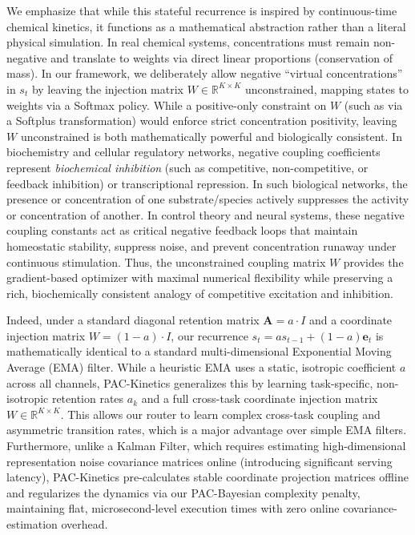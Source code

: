 We emphasize that while this stateful recurrence is inspired by continuous-time chemical kinetics, it functions as a mathematical abstraction rather than a literal physical simulation. In real chemical systems, concentrations must remain non-negative and translate to weights via direct linear proportions (conservation of mass). In our framework, we deliberately allow negative ``virtual concentrations'' in $s_t$ by leaving the injection matrix $W \in \mathbb{R}^{K \times K}$ unconstrained, mapping states to weights via a Softmax policy. While a positive-only constraint on $W$ (such as via a Softplus transformation) would enforce strict concentration positivity, leaving $W$ unconstrained is both mathematically powerful and biologically consistent. In biochemistry and cellular regulatory networks, negative coupling coefficients represent \emph{biochemical inhibition} (such as competitive, non-competitive, or feedback inhibition) or transcriptional repression. In such biological networks, the presence or concentration of one substrate/species actively suppresses the activity or concentration of another. In control theory and neural systems, these negative coupling constants act as critical negative feedback loops that maintain homeostatic stability, suppress noise, and prevent concentration runaway under continuous stimulation. Thus, the unconstrained coupling matrix $W$ provides the gradient-based optimizer with maximal numerical flexibility while preserving a rich, biochemically consistent analogy of competitive excitation and inhibition.

Indeed, under a standard diagonal retention matrix $\mathbf{A} = a \cdot I$ and a coordinate injection matrix $W = (1 - a) \cdot I$, our recurrence $s_t = a s_{t-1} + (1 - a) \mathbf{e}_t$ is mathematically identical to a standard multi-dimensional Exponential Moving Average (EMA) filter. While a heuristic EMA uses a static, isotropic coefficient $a$ across all channels, \textsf{PAC-Kinetics} generalizes this by learning task-specific, non-isotropic retention rates $a_k$ and a full cross-task coordinate injection matrix $W \in \mathbb{R}^{K \times K}$. This allows our router to learn complex cross-task coupling and asymmetric transition rates, which is a major advantage over simple EMA filters. Furthermore, unlike a Kalman Filter, which requires estimating high-dimensional representation noise covariance matrices online (introducing significant serving latency), \textsf{PAC-Kinetics} pre-calculates stable coordinate projection matrices offline and regularizes the dynamics via our PAC-Bayesian complexity penalty, maintaining flat, microsecond-level execution times with zero online covariance-estimation overhead.

